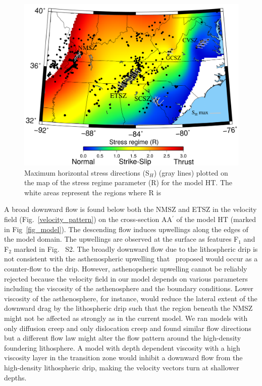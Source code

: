 \documentclass[draft,linenumbers]{agujournal2018}
\begin{document}
\begin{figure}[h!]
    \centering
    \includegraphics[width=0.75\linewidth]{figures/sigma1.png}
    \caption{Maximum horizontal stress directions (S$_H$) (gray lines) plotted on the map of the stress regime parameter (R) for the model HT. The white areas represent the regions where R is }
    \label{sigma1}
\end{figure}

A broad downward flow is found below both the NMSZ and ETSZ in the velocity field (Fig.~\ref{velocity_pattern}) on the cross-section AA$^{\prime}$ of the model HT (marked in Fig~\ref{fig_model}). The descending flow induces upwellings along the edges of the model domain. The upwellings are observed at the surface as features F$_1$ and F$_2$ marked in Fig.~ S2. The broadly downward flow due to the lithospheric drip is not consistent with the asthenospheric upwelling that~\citet{Biryol_2016} proposed would occur as a counter-flow to the drip. However, asthenopsheric upwelling cannot be reliably rejected because the velocity field in our model depends on various parameters including the viscosity of the asthenosphere and the boundary conditions. Lower viscosity of the asthenosphere, for instance, would reduce the lateral extent of the downward drag by the lithospheric drip such that the region beneath the NMSZ might not be affected as strongly as in the current model. We ran models with only diffusion creep and only dislocation creep and found similar flow directions  but a different flow law might alter the flow pattern around the high-density foundering lithosphere. A model with depth dependent viscosity with a high viscosity layer in the transition zone would inhibit a downward flow from the high-density lithospheric drip, making the velocity vectors turn at shallower depths.
\end{document}
